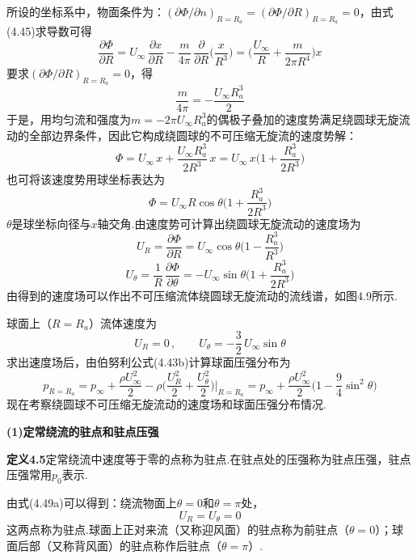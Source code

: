 所设的坐标系中，物面条件为：$(\partial\Phi/\partial n)_{R=R_a}=(\partial\Phi/\partial R)_{R=R_a}=0$，由式(4.45)求导数可得
\[
\frac{\partial\Phi}{\partial R}=U_\infty\,\frac{\partial x}{\partial R}-\frac{m}{4\pi}\,\frac{\partial}{\partial R}\Big(\frac{x}{R^{3}}\Big)=\Big(\frac{U_\infty}{R}+\frac{m}{2\pi R^{4}}\Big)x
\]
要求$(\partial\Phi/\partial R)_{R=R_a}=0$，得
\[
\frac{m}{4\pi}=-\frac{U_\infty R_a^{3}}{2}
\]
于是，用均匀流和强度为$m=-2\pi U_\infty R_a^{3}$的偶极子叠加的速度势满足绕圆球无旋流动的全部边界条件，因此它构成绕圆球的不可压缩无旋流的速度势解：
\begin{equation*}
\Phi=U_\infty\,x+\frac{U_\infty R_a^{3}}{2R^{3}}\,x=U_\infty\,x\Big(1+\frac{R_a^{3}}{2R^{3}}\Big)
\tag{4.46}
\end{equation*}
也可将该速度势用球坐标表达为
\begin{equation*}
\Phi=U_\infty R\cos\theta\Big(1+\frac{R_a^{3}}{2R^{3}}\Big)
\tag{4.47}
\end{equation*}
$\theta$是球坐标向径与$x$轴交角.由速度势可计算出绕圆球无旋流动的速度场为
\begin{equation*}
U_R=\frac{\partial\Phi}{\partial R}=U_\infty\cos\theta\Big(1-\frac{R_a^{3}}{R^{3}}\Big)
\tag{4.48a}
\end{equation*}
\begin{equation*}
U_\theta=\frac{1}{R}\,\frac{\partial\Phi}{\partial\theta}=-U_\infty\sin\theta\Big(1+\frac{R_a^{3}}{2R^{3}}\Big)
\tag{4.48b}
\end{equation*}
由得到的速度场可以作出不可压缩流体绕圆球无旋流动的流线谱，如图4.9所示.

球面上（$R=R_a$）流体速度为
\begin{equation*}
U_R=0\,,\qquad U_\theta=-\frac{3}{2}\,U_\infty\sin\theta
\tag{4.49a}
\end{equation*}
求出速度场后，由伯努利公式(4.43b)计算球面压强分布为
\begin{equation*}
p_{R=R_a}=p_\infty+\frac{\rho U_\infty^{2}}{2}-\rho\Big(\frac{U_R^{2}}{2}+\frac{U_\theta^{2}}{2}\Big)\bigg|_{R=R_a}=p_\infty+\frac{\rho U_\infty^{2}}{2}\Big(1-\frac{9}{4}\sin^{2}\theta\Big)
\tag{4.49b}
\end{equation*}
现在考察绕圆球不可压缩无旋流动的速度场和球面压强分布情况.

\textbf{(1)定常绕流的驻点和驻点压强}

\noindent\textbf{定义4.5}\quad 定常绕流中速度等于零的点称为驻点.在驻点处的压强称为驻点压强，驻点压强常用$p_0$表示.

由式(4.49a)可以得到：绕流物面上$\theta=0$和$\theta=\pi$处，
\[
U_R=U_\theta=0
\]
这两点称为驻点.球面上正对来流（又称迎风面）的驻点称为前驻点（$\theta=0$）；球面后部（又称背风面）的驻点称作后驻点（$\theta=\pi$）.

